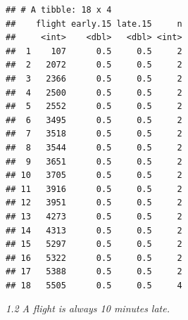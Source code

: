 \documentclass[]{book}
\newenvironment{Shaded}{\begin{snugshade}}{\end{snugshade}}
\newcommand{\CommentTok}[1]{\textcolor[rgb]{0.56,0.35,0.01}{\textit{#1}}}
\newcommand{\DataTypeTok}[1]{\textcolor[rgb]{0.13,0.29,0.53}{#1}}
\newcommand{\DecValTok}[1]{\textcolor[rgb]{0.00,0.00,0.81}{#1}}
\newcommand{\FloatTok}[1]{\textcolor[rgb]{0.00,0.00,0.81}{#1}}
\newcommand{\KeywordTok}[1]{\textcolor[rgb]{0.13,0.29,0.53}{\textbf{#1}}}
\newcommand{\NormalTok}[1]{#1}
\newcommand{\OperatorTok}[1]{\textcolor[rgb]{0.81,0.36,0.00}{\textbf{#1}}}
\newcommand{\OtherTok}[1]{\textcolor[rgb]{0.56,0.35,0.01}{#1}}
\newcommand{\StringTok}[1]{\textcolor[rgb]{0.31,0.60,0.02}{#1}}
\theoremstyle{definition}
\theoremstyle{definition}
\theoremstyle{definition}
\theoremstyle{remark}
\begin{document}
\begin{Shaded}
\end{Shaded}

\begin{verbatim}
## # A tibble: 18 x 4
##    flight early.15 late.15     n
##     <int>    <dbl>   <dbl> <int>
##  1    107      0.5     0.5     2
##  2   2072      0.5     0.5     2
##  3   2366      0.5     0.5     2
##  4   2500      0.5     0.5     2
##  5   2552      0.5     0.5     2
##  6   3495      0.5     0.5     2
##  7   3518      0.5     0.5     2
##  8   3544      0.5     0.5     2
##  9   3651      0.5     0.5     2
## 10   3705      0.5     0.5     2
## 11   3916      0.5     0.5     2
## 12   3951      0.5     0.5     2
## 13   4273      0.5     0.5     2
## 14   4313      0.5     0.5     2
## 15   5297      0.5     0.5     2
## 16   5322      0.5     0.5     2
## 17   5388      0.5     0.5     2
## 18   5505      0.5     0.5     4
\end{verbatim}

\emph{1.2 A flight is always 10 minutes late.}

\begin{Shaded}
\end{Shaded}
\end{document}
